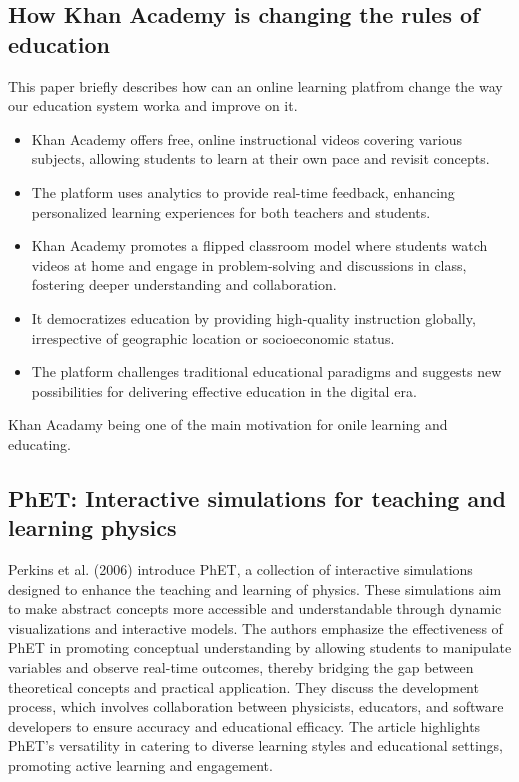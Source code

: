 \subsection*{How Khan Academy is changing the rules of education}
This paper briefly describes how can an online learning platfrom change the way our education system worka and improve on it.
\begin{itemize}
    \item Khan Academy offers free, online instructional videos covering various subjects, allowing students to learn at their own pace and revisit concepts.
    
    \item The platform uses analytics to provide real-time feedback, enhancing personalized learning experiences for both teachers and students.
    
    \item Khan Academy promotes a flipped classroom model where students watch videos at home and engage in problem-solving and discussions in class, fostering deeper understanding and collaboration.
    
    \item It democratizes education by providing high-quality instruction globally, irrespective of geographic location or socioeconomic status.
    
    \item The platform challenges traditional educational paradigms and suggests new possibilities for delivering effective education in the digital era.
\end{itemize}
Khan Acadamy being one of the main motivation for onile learning and educating.
\cite{thompson2011khan}
\subsection*{PhET: Interactive simulations for teaching and learning physics}
Perkins et al. (2006) introduce PhET, a collection of interactive simulations designed to enhance the teaching and learning of physics. These simulations aim to make abstract concepts more accessible and understandable through dynamic visualizations and interactive models. The authors emphasize the effectiveness of PhET in promoting conceptual understanding by allowing students to manipulate variables and observe real-time outcomes, thereby bridging the gap between theoretical concepts and practical application. They discuss the development process, which involves collaboration between physicists, educators, and software developers to ensure accuracy and educational efficacy. The article highlights PhET's versatility in catering to diverse learning styles and educational settings, promoting active learning and engagement. \cite{perkins2006phet}
